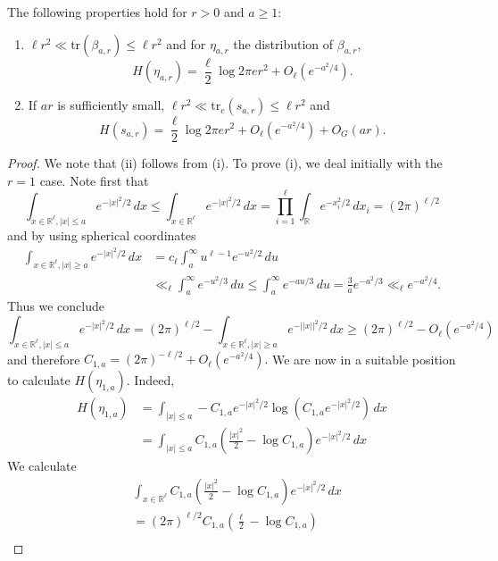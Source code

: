 \documentclass[10pt,a4paper]{amsart}
\newcommand{\R}{\mathbb{R}}
\newcommand{\tr}{\mathrm{tr}}
\begin{document}
\begin{lemma}\label{VarEntProperties}
    The following properties hold for $r > 0$ and $a\geq 1$:
    \begin{enumerate}[label = (\roman*)]
        \item $\ell r^2 \ll \tr(\beta_{a,r}) \leq \ell r^2$ and for $\eta_{a,r}$ the distribution of $\beta_{a,r}$, $$H(\eta_{a,r}) = \frac{\ell}{2}  \log 2\pi e r^2 + O_{\ell}(e^{-a^2/4}).$$
        \item If $ar$ is sufficiently small,  $\ell r^2 \ll \tr_e(s_{a,r}) \leq \ell r^2$ and 
        $$H(s_{a,r}) = \frac{\ell}{2}  \log 2\pi e r^2 + O_{\ell}(e^{-a^2/4}) + O_{G}(ar).$$
    \end{enumerate}
\end{lemma}

\begin{proof}
    We note that (ii) follows from (i). To prove (i), we deal initially with the $r = 1$ case. Note first that $$\int_{x \in \R^{\ell}, |x| \leq a} e^{-|x|^2/2} \, dx \leq \int_{x \in \R^{\ell}} e^{-|x|^2/2} \, dx = \prod_{i = 1}^\ell \int_{\R} e^{-x_i^2/2 } \, dx_i = (2\pi)^{\ell/2}$$ and by using spherical coordinates 
    \begin{align*}
        \int_{x \in \R^{\ell}, |x| \geq a} e^{-|x|^2/2} \, dx &= c_{\ell} \int_{a}^{\infty} u^{\ell - 1} e^{-u^2/2} \, du \\ &\ll_{\ell} \int_{a}^{\infty}  e^{-u^2/3} \, du \leq \int_a^{\infty} e^{-au/3} \, du = \frac{3}{a}e^{-a^2/3} \ll_{\ell} e^{-a^2/4}.
    \end{align*} Thus we conclude $$\int_{x \in \R^{\ell}, |x| \leq a} e^{-|x|^2/2} \, dx  = (2\pi)^{\ell/2} - \int_{x \in \R^{\ell}, |x| \geq a} e^{-||x||^2/2} \, dx \geq (2\pi)^{\ell/2} - O_{\ell}(e^{-a^2/4})$$ and therefore $C_{1,a} = (2\pi)^{-\ell/2} + O_{\ell}(e^{-a^2/4}).$ We are now in a suitable position to calculate $H(\eta_{1,a})$. Indeed, 
    \begin{align*}
        H(\eta_{1,a}) &= \int_{|x| \leq a} -C_{1,a} e^{-|x|^2/2} \log\left(C_{1,a} e^{-|x|^2/2} \right) \, dx \\ &= \int_{|x| \leq a} C_{1,a}\left(  \frac{|x|^2}{2} - \log C_{1,a} \right) e^{-|x|^2/2}  \, dx 
    \end{align*} 
    We calculate 
    \begin{align*}
    &\int_{x\in \R^{\ell}} C_{1,a}\left(  \frac{|x|^2}{2} - \log C_{1,a} \right) e^{-|x|^2/2}  \, dx \\ &= (2\pi)^{\ell/2} C_{1,a}\left( \frac{\ell}{2} - \log C_{1,a} \right) \\

\end{align*}
\end{proof}
\end{document}
